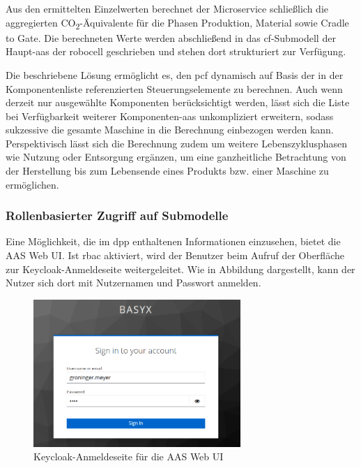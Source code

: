 Aus den ermittelten Einzelwerten berechnet der Microservice schließlich die aggregierten CO\textsubscript{2}-Äquivalente für die Phasen Produktion, Material sowie Cradle to Gate. 
Die berechneten Werte werden abschließend in das \acs{cf}-Submodell der Haupt-\acs{aas} der robocell geschrieben und stehen dort strukturiert zur Verfügung.

Die beschriebene Lösung ermöglicht es, den \acs{pcf} dynamisch auf Basis der in der Komponentenliste referenzierten Steuerungselemente zu berechnen. 
Auch wenn derzeit nur ausgewählte Komponenten berücksichtigt werden, lässt sich die Liste bei Verfügbarkeit weiterer Komponenten-\acs{aas} unkompliziert erweitern, sodass sukzessive die gesamte Maschine in die Berechnung einbezogen werden kann. 
Perspektivisch lässt sich die Berechnung zudem um weitere Lebenszyklusphasen wie Nutzung oder Entsorgung ergänzen, um eine ganzheitliche Betrachtung von der Herstellung bis zum Lebensende eines Produkts bzw. einer Maschine zu ermöglichen.

\subsubsection{Rollenbasierter Zugriff auf Submodelle}
Eine Möglichkeit, die im \acs{dpp} enthaltenen Informationen einzusehen, bietet die AAS Web UI. 
Ist \acs{rbac} aktiviert, wird der Benutzer beim Aufruf der Oberfläche zur Keycloak-Anmeldeseite weitergeleitet. 
Wie in Abbildung dargestellt, kann der Nutzer sich dort mit Nutzernamen und Passwort anmelden.

\begin{figure}[htbp]
    \centering
        \includegraphics[width=0.7\textwidth]{Bilder/Ergebnisse/DPP/KeycloakAnmeldeSeite.png}
    
    \caption{Keycloak-Anmeldeseite für die AAS Web UI}
    \label{fig:SequenzdiagrammPCF}
\end{figure}

